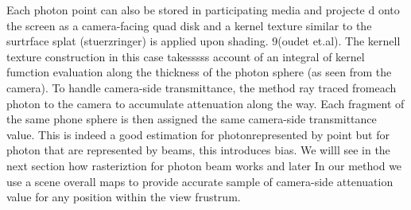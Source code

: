 Each photon point can also be stored in participating media and projecte d onto the screen as a camera-facing quad disk and a kernel texture similar to the surtrface splat (stuerzringer) is applied upon shading. 9(oudet et.al). The kernell texture construction in this case takesssss account of an integral of kernel fumction evaluation along the thickness of the photon sphere (as seen from the camera). To handle camera-side transmittance, the method ray traced fromeach photon to the camera to accumulate attenuation along the way. Each fragment of the same phone sphere is then assigned the same camera-side transmittance value. This is indeed a good estimation for photonrepresented by point but for photon that are represented by beams, this introduces bias. We willl see in the next section how rasteriztion for photon beam works and later In our method we use a scene overall maps to provide accurate sample of camera-side attenuation value for any position within the view frustrum.
